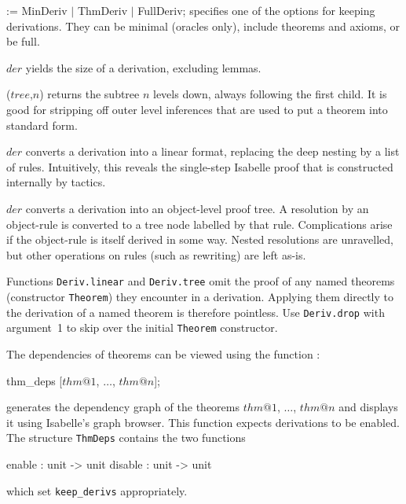 \begin{ttdescription}
\item[\ttindexbold{keep_derivs} := MinDeriv $|$ ThmDeriv $|$ FullDeriv;] 
specifies one of the options for keeping derivations.  They can be
minimal (oracles only), include theorems and axioms, or be full.

\item[\ttindexbold{Deriv.size} $der$] yields the size of a derivation,
  excluding lemmas.

\item[\ttindexbold{Deriv.drop} ($tree$,$n$)] returns the subtree $n$ levels
  down, always following the first child.  It is good for stripping off
  outer level inferences that are used to put a theorem into standard form.

\item[\ttindexbold{Deriv.linear} $der$] converts a derivation into a linear
  format, replacing the deep nesting by a list of rules.  Intuitively, this
  reveals the single-step Isabelle proof that is constructed internally by
  tactics.  

\item[\ttindexbold{Deriv.tree} $der$] converts a derivation into an
  object-level proof tree.  A resolution by an object-rule is converted to a
  tree node labelled by that rule.  Complications arise if the object-rule is
  itself derived in some way.  Nested resolutions are unravelled, but other
  operations on rules (such as rewriting) are left as-is.  
\end{ttdescription}

Functions {\tt Deriv.linear} and {\tt Deriv.tree} omit the proof of any named
theorems (constructor {\tt Theorem}) they encounter in a derivation.  Applying
them directly to the derivation of a named theorem is therefore pointless.
Use {\tt Deriv.drop} with argument~1 to skip over the initial {\tt Theorem}
constructor.


\medskip

The dependencies of theorems can be viewed using the function :
\begin{ttbox}
thm_deps [\(thm@1\), \(\ldots\), \(thm@n\)];
\end{ttbox}
generates the dependency graph of the theorems $thm@1$, $\ldots$, $thm@n$ and
displays it using Isabelle's graph browser. This function expects derivations
to be enabled. The structure \texttt{ThmDeps} contains the two functions
\begin{ttbox}
enable : unit -> unit
disable : unit -> unit
\end{ttbox}
which set \texttt{keep_derivs} appropriately.


